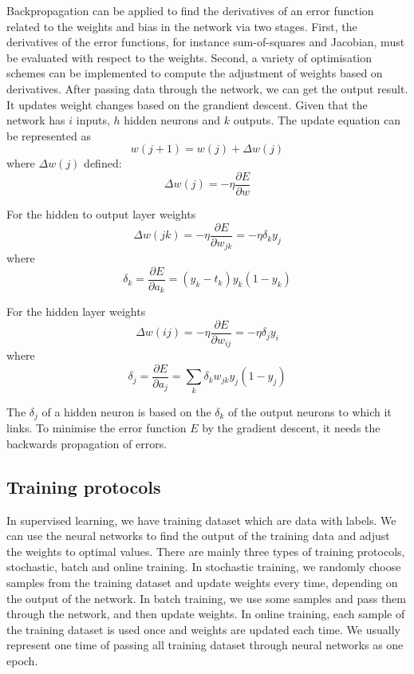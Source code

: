 Backpropagation can be applied to find the derivatives of an error function related to the weights and bias in the network via two stages. First, the derivatives of the error functions, for instance sum-of-squares and Jacobian, must be evaluated with respect to the weights. Second, a variety of optimisation schemes can be implemented to compute the adjustment of weights based on derivatives. After passing data through the network, we can get the output result. It updates weight changes based on the grandient descent. Given that the network has $i$ inputs, $h$ hidden neurons and $k$ outputs. The update equation can be represented as 
\begin{equation}\label{eq:UpdateWeights}
w(j+1) = w(j) + \Delta w(j)
\end{equation}
where $\Delta w(j)$ defined: 
\begin{equation}\label{eq:DeltaWeights}
\Delta w(j) = -\eta \frac{\partial E}{\partial w}
\end{equation}

For the hidden to output layer weights
\begin{equation}\label{eq:h2oBP}
\Delta w(jk) = -\eta \frac{\partial E}{\partial w_{jk}} = -\eta \delta_{k}y_{j}
\end{equation}
where $$\delta_{k} = \frac{\partial E}{\partial a_{k}} = (y_{k} - t_{k})y_{k}(1 - y_{k})$$

For the hidden layer weights
\begin{equation}\label{eq:hiddenBP}
\Delta w(ij) = -\eta \frac{\partial E}{\partial w_{ij}} = -\eta \delta_{j}y_{i}
\end{equation}
where $$\delta_{j} = \frac{\partial E}{\partial a_{j}} = \displaystyle\sum_{k} \delta_{k}w_{jk}y_{j}(1 - y_{j})$$

The $\delta_{j}$ of a hidden neuron is based on the $\delta_{k}$ of the output neurons to which it links. To minimise the error function $E$ by the gradient descent, it needs the backwards propagation of errors.

\subsection{Training protocols}

In supervised learning, we have training dataset which are data with labels. We can use the neural networks to find the output of the training data and adjust the weights to optimal values. There are mainly  three types of training protocols, stochastic, batch and online training. In stochastic training, we randomly choose samples from the training dataset and update weights every time, depending on the output of the network. In batch training, we use some samples and pass them through the network, and then update weights. In online training, each sample of the training dataset is used once and weights are updated each time. We usually represent one time of passing all training dataset through neural networks as one epoch.

